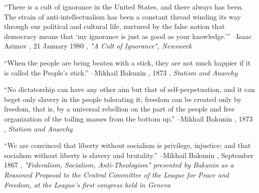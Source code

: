 \documentclass{article}%
\begin{document}
\linebreak%
\vspace{1mm}%
\begin{minipage}{\textwidth}%
\flushleft%
“There is a cult of ignorance in the United States, and there always has been. The strain of anti{-}intellectualism has been a constant thread winding its way through our political and cultural life, nurtured by the false notion that democracy means that ‘my ignorance is just as good as your knowledge.’”%
\linebreak%
\vspace{1mm}%
–Isaac Asimov%
, 21 January 1980%
, \textit{"A Cult of Ignorance", Newsweek}%
\linebreak%
\vspace{1mm}%
\end{minipage}%
\linebreak%
\vspace{1mm}%
\begin{minipage}{\textwidth}%
\flushleft%
“When the people are being beaten with a stick, they are not much happier if it is called the People's stick.”%
\linebreak%
\vspace{1mm}%
–Mikhail Bakunin%
, 1873%
, \textit{Statism and Anarchy}%
\linebreak%
\vspace{1mm}%
\end{minipage}%
\linebreak%
\vspace{1mm}%
\begin{minipage}{\textwidth}%
\flushleft%
“No dictatorship can have any other aim but that of self{-}perpetuation, and it can beget only slavery in the people tolerating it; freedom can be created only by freedom, that is, by a universal rebellion on the part of the people and free organization of the toiling masses from the bottom up.”%
\linebreak%
\vspace{1mm}%
–Mikhail Bakunin%
, 1873%
, \textit{Statism and Anarchy}%
\linebreak%
\vspace{1mm}%
\end{minipage}%
\linebreak%
\vspace{1mm}%
\begin{minipage}{\textwidth}%
\flushleft%
“We are convinced that liberty without socialism is privilege, injustice; and that socialism without liberty is slavery and brutality.”%
\linebreak%
\vspace{1mm}%
–Mikhail Bakunin%
, September 1867%
, \textit{"Federalism, Socialism, Anti-Theologism" presented by Bakunin as a Reasoned Proposal  to the Central Committee of the League for Peace and Freedom, at the League's first  congress held in Geneva}%
\linebreak%
\vspace{1mm}%
\end{minipage}%
\end{document}

